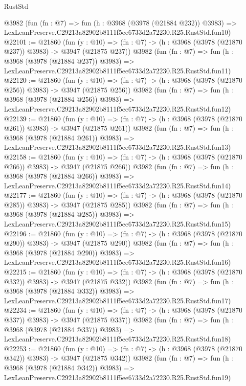 \begin{lexlean}{RustStd}
\begin{coremodule}
    @3982
    (fun (fn : @7) =>
    fun (h : @3968 (@3978 (@21884 @232)) @3983) =>
    LexLeanPreserve.C29213a82902b8111f5ee6733d2a72230.R25.RustStd.fun10)
@22101 := @21860
    (fun (y : @10) => (fn : @7) -> (h : @3968 (@3978 (@21870 @237)) @3983) -> @3947 (@21875 @237))
    @3982
    (fun (fn : @7) =>
    fun (h : @3968 (@3978 (@21884 @237)) @3983) =>
    LexLeanPreserve.C29213a82902b8111f5ee6733d2a72230.R25.RustStd.fun11)
@22120 := @21860
    (fun (y : @10) => (fn : @7) -> (h : @3968 (@3978 (@21870 @256)) @3983) -> @3947 (@21875 @256))
    @3982
    (fun (fn : @7) =>
    fun (h : @3968 (@3978 (@21884 @256)) @3983) =>
    LexLeanPreserve.C29213a82902b8111f5ee6733d2a72230.R25.RustStd.fun12)
@22139 := @21860
    (fun (y : @10) => (fn : @7) -> (h : @3968 (@3978 (@21870 @261)) @3983) -> @3947 (@21875 @261))
    @3982
    (fun (fn : @7) =>
    fun (h : @3968 (@3978 (@21884 @261)) @3983) =>
    LexLeanPreserve.C29213a82902b8111f5ee6733d2a72230.R25.RustStd.fun13)
@22158 := @21860
    (fun (y : @10) => (fn : @7) -> (h : @3968 (@3978 (@21870 @266)) @3983) -> @3947 (@21875 @266))
    @3982
    (fun (fn : @7) =>
    fun (h : @3968 (@3978 (@21884 @266)) @3983) =>
    LexLeanPreserve.C29213a82902b8111f5ee6733d2a72230.R25.RustStd.fun14)
@22177 := @21860
    (fun (y : @10) => (fn : @7) -> (h : @3968 (@3978 (@21870 @285)) @3983) -> @3947 (@21875 @285))
    @3982
    (fun (fn : @7) =>
    fun (h : @3968 (@3978 (@21884 @285)) @3983) =>
    LexLeanPreserve.C29213a82902b8111f5ee6733d2a72230.R25.RustStd.fun15)
@22196 := @21860
    (fun (y : @10) => (fn : @7) -> (h : @3968 (@3978 (@21870 @290)) @3983) -> @3947 (@21875 @290))
    @3982
    (fun (fn : @7) =>
    fun (h : @3968 (@3978 (@21884 @290)) @3983) =>
    LexLeanPreserve.C29213a82902b8111f5ee6733d2a72230.R25.RustStd.fun16)
@22215 := @21860
    (fun (y : @10) => (fn : @7) -> (h : @3968 (@3978 (@21870 @332)) @3983) -> @3947 (@21875 @332))
    @3982
    (fun (fn : @7) =>
    fun (h : @3968 (@3978 (@21884 @332)) @3983) =>
    LexLeanPreserve.C29213a82902b8111f5ee6733d2a72230.R25.RustStd.fun17)
@22234 := @21860
    (fun (y : @10) => (fn : @7) -> (h : @3968 (@3978 (@21870 @337)) @3983) -> @3947 (@21875 @337))
    @3982
    (fun (fn : @7) =>
    fun (h : @3968 (@3978 (@21884 @337)) @3983) =>
    LexLeanPreserve.C29213a82902b8111f5ee6733d2a72230.R25.RustStd.fun18)
@22253 := @21860
    (fun (y : @10) => (fn : @7) -> (h : @3968 (@3978 (@21870 @342)) @3983) -> @3947 (@21875 @342))
    @3982
    (fun (fn : @7) =>
    fun (h : @3968 (@3978 (@21884 @342)) @3983) =>
    LexLeanPreserve.C29213a82902b8111f5ee6733d2a72230.R25.RustStd.fun19)

\end{coremodule}
\end{lexlean}
